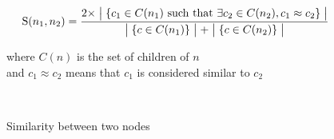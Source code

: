 \begin{figure}
\centering
\[
    \text{S}(n_{1}, n_{2}) =
    \frac
    { 2 \times \bigm| \{ c_{1} \in C(n_{1}) \text{ such that } \exists c_{2} \in C(n_{2}), c_{1} \approx c_{2} \} \bigm| }
    { \bigm| \{ c \in C(n_{1}) \} \bigm| + \bigm| \{ c \in C(n_{2}) \} \bigm| }
\]

where $C(n)$ is the set of children of $n$
\\
and $c_{1} \approx c_{2}$ means that $c_{1}$ is considered similar to $c_{2}$
\caption{Similarity between two nodes}~\label{similarity}
\end{figure}
